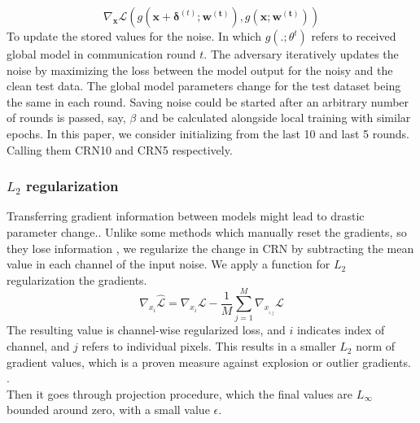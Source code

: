 \begin{equation}
\label{eqt:loss1}
 \nabla_{\bm{x}}{\mathcal{L}}(g(\bm{x+\delta}^{(t)};\bm{w^{(t)}}),g(\bm{x};\bm{w^{(t)}}))
\end{equation}
To update the stored values for the noise. In which $g(.;\theta^{t})$ refers to received global model in communication round $t$.  The adversary iteratively updates the noise by maximizing the loss between the model output for the noisy and the clean test data. 
The global model parameters change for the test dataset being the same in each round. 
\cite{zhang2019theoretically}
Saving noise could be started after an arbitrary number of rounds is passed, say, $\beta$ and be calculated alongside local training with similar epochs. In this paper, we consider initializing from the last 10 and last 5 rounds. Calling them CRN10 and CRN5 respectively.
\\\subsubsection{$L_{2}$ regularization}

Transferring gradient information between models might lead to drastic parameter change.\cite{zhang2019theoretically,pan2019improving,dettmers20158}. Unlike some methods which manually reset the gradients, so they lose information \cite{zheng2020efficient}, we regularize the change in CRN by subtracting the mean value in each channel of the input noise. We apply a function for $L_{2}$ regularization the gradients.
\begin{equation}
    \nabla_{x_{i}}\mathcal{\hat{L}} = \nabla_{x_{i}}\mathcal{{L}} -  \frac{1}{M} \sum\limits_{j=1}^{M}{\nabla_{x}_{_{i,j}}} \mathcal{{L}}
\end{equation}
The resulting value is channel-wise regularized loss, and $i$ indicates index of channel, and $j$ refers to individual pixels. This results in a smaller $L_{2}$ norm of gradient values, which is a proven measure against explosion or outlier gradients. \cite{pascanu2013difficulty}\cite{kim2016accurate} . 
\\Then it goes through projection procedure, which the final values are $L_\infty$ bounded around zero, with a small value $\epsilon$. 


